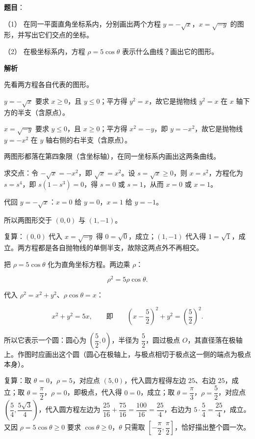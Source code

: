 \begin{answer}

\textbf{题目}：

（1） 在同一平面直角坐标系内，分别画出两个方程 $y=-\sqrt{x}$，$x=\sqrt{-y}$ 的图形，并写出它们交点的坐标。

（2） 在极坐标系内，方程 $\rho=5\cos\theta$ 表示什么曲线？画出它的图形。

\textbf{解析}


先看两方程各自代表的图形。

$y=-\sqrt{x}$ 要求 $x\geqslant0$，且 $y\leqslant0$；平方得 $y^2=x$，故它是抛物线 $y^2=x$ 在 $x$ 轴下方的半支（含原点）。

$x=\sqrt{-y}$ 要求 $y\leqslant0$，且 $x\geqslant0$；平方得 $x^2=-y$，即 $y=-x^2$，故它是抛物线 $y=-x^2$ 在 $y$ 轴右侧的右半支（含原点）。

两图形都落在第四象限（含坐标轴），在同一坐标系内画出这两条曲线。

求交点：令 $-\sqrt{x}=-x^2$，即 $\sqrt{x}=x^2$。设 $s=\sqrt{x}\geqslant0$，则 $x=s^2$，方程化为 $s=s^4$，即 $s(1-s^3)=0$，得 $s=0$ 或 $s=1$，从而 $x=0$ 或 $x=1$。

代回 $y=-\sqrt{x}$：$x=0$ 给 $y=0$，$x=1$ 给 $y=-1$。

所以两图形交于 $(0,0)$ 与 $(1,-1)$。

复算：$(0,0)$ 代入 $x=\sqrt{-y}$ 得 $0=\sqrt0$，成立；$(1,-1)$ 代入得 $1=\sqrt1$，成立。两方程都是各自抛物线的单侧半支，故除这两点外不再相交。


把 $\rho=5\cos\theta$ 化为直角坐标方程。两边乘 $\rho$：

\nopagebreak[4]
\[
\rho^2=5\rho\cos\theta.
\]

代入 $\rho^2=x^2+y^2$、$\rho\cos\theta=x$：

\nopagebreak[4]
\[
x^2+y^2=5x,\qquad\text{即}\qquad\left(x-\frac52\right)^2+y^2=\left(\frac52\right)^2.
\]

所以它表示一个圆：圆心为 $\left(\dfrac52,0\right)$，半径为 $\dfrac52$，圆过极点 $O$，其直径落在极轴上。作图时应画出这个圆（圆心在极轴上，与极点相切于极点这一侧的端点为极点本身）。

复算：取 $\theta=0$，$\rho=5$，对应点 $(5,0)$，代入圆方程得左边 $25$、右边 $25$，成立；取 $\theta=\dfrac{\pi}{2}$，$\rho=0$，即极点，代入得 $0=0$，成立；取 $\theta=\dfrac{\pi}{3}$，$\rho=\dfrac52$，对应点 $\left(\dfrac54,\dfrac{5\sqrt3}{4}\right)$，代入圆方程左边为 $\dfrac{25}{16}+\dfrac{75}{16}=\dfrac{100}{16}=\dfrac{25}{4}$，右边为 $5\cdot\dfrac54=\dfrac{25}{4}$，成立。又因 $\rho=5\cos\theta\geqslant0$ 要求 $\cos\theta\geqslant0$，$\theta$ 只需取 $\left[-\dfrac\pi2,\dfrac\pi2\right]$，恰好描出整个圆一次。



\end{answer}
